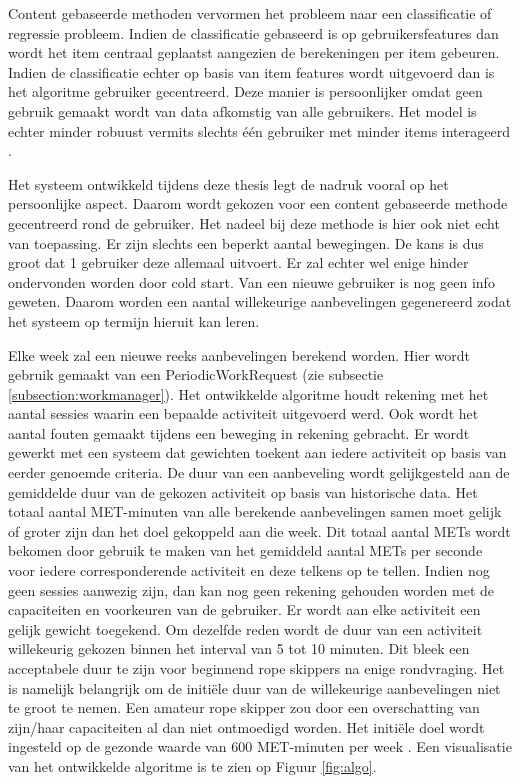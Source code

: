 Content gebaseerde methoden vervormen het probleem naar een classificatie of regressie probleem.
Indien de classificatie gebaseerd is op gebruikersfeatures dan wordt het item centraal geplaatst aangezien de berekeningen per item gebeuren.
Indien de classificatie echter op basis van item features wordt uitgevoerd dan is het algoritme gebruiker gecentreerd. Deze manier is persoonlijker omdat geen gebruik gemaakt wordt van data afkomstig van alle gebruikers. Het model is echter minder robuust vermits slechts één gebruiker met minder items interageerd \cite{ref50}.

Het systeem ontwikkeld tijdens deze thesis legt de nadruk vooral op het persoonlijke aspect. Daarom wordt gekozen voor een content gebaseerde methode gecentreerd rond de gebruiker. Het nadeel bij deze methode is hier ook niet echt van toepassing. Er zijn slechts een beperkt aantal bewegingen. De kans is dus groot dat 1 gebruiker deze allemaal uitvoert. Er zal echter wel enige hinder ondervonden worden door cold start. Van een nieuwe gebruiker is nog geen info geweten. Daarom worden een aantal willekeurige aanbevelingen gegenereerd zodat het systeem op termijn hieruit kan leren.

Elke week zal een nieuwe reeks aanbevelingen berekend worden. Hier wordt gebruik gemaakt van een PeriodicWorkRequest (zie subsectie \ref{subsection:workmanager}). Het ontwikkelde algoritme houdt rekening met het aantal sessies waarin een bepaalde activiteit uitgevoerd werd. Ook wordt het aantal fouten gemaakt tijdens een beweging in rekening gebracht. Er wordt gewerkt met een systeem dat gewichten toekent aan iedere activiteit op basis van eerder genoemde criteria. De duur van een aanbeveling wordt gelijkgesteld aan de gemiddelde duur van de gekozen activiteit op basis van historische data. Het totaal aantal MET-minuten van alle berekende aanbevelingen samen moet gelijk of groter zijn dan het doel gekoppeld aan die week. Dit totaal aantal METs wordt bekomen door gebruik te maken van het gemiddeld aantal METs per seconde voor iedere corresponderende activiteit en deze telkens op te tellen.
Indien nog geen sessies aanwezig zijn, dan kan nog geen rekening gehouden worden met de capaciteiten en voorkeuren van de gebruiker. Er wordt aan elke activiteit een gelijk gewicht toegekend. Om dezelfde reden wordt de duur van een activiteit willekeurig gekozen binnen het interval van 5 tot 10 minuten. Dit bleek een acceptabele duur te zijn voor beginnend rope skippers na enige rondvraging. Het is namelijk belangrijk om de initiële duur van de willekeurige aanbevelingen niet te groot te nemen. Een amateur rope skipper zou door een overschatting van zijn/haar capaciteiten al dan niet ontmoedigd worden. Het initiële doel wordt ingesteld op de gezonde waarde van 600 MET-minuten per week \cite{ref21}.
Een visualisatie van het ontwikkelde algoritme is te zien op Figuur \ref{fig:algo}.

